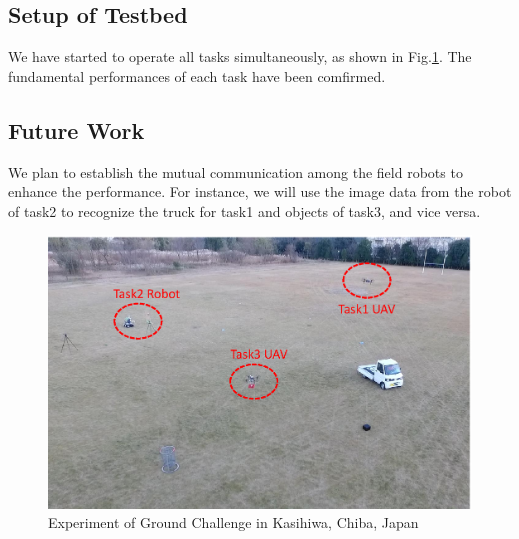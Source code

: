 \documentclass{standalone}
\begin{document}
\subsection{Setup of Testbed}
We have started to operate all tasks simultaneously, as shown in Fig.\ref{fig:grand}. The fundamental performances of each task have been comfirmed.

 \subsection{Future Work}
We plan to establish the mutual communication among the field robots to enhance the performance. For instance, we will use the image data from the robot of task2 to recognize the truck for task1 and objects of task3, and vice versa.
 
\begin{figure}[h]
    \begin{center}
      \includegraphics[clip, bb= 0 0 560 360, width=1.0\columnwidth]{sections/grand/images/grand_challenge.eps}
    \end{center}
   \caption{Experiment of Ground Challenge in Kasihiwa, Chiba, Japan}
   \label{fig:grand}
 \end{figure}
\end{document}
